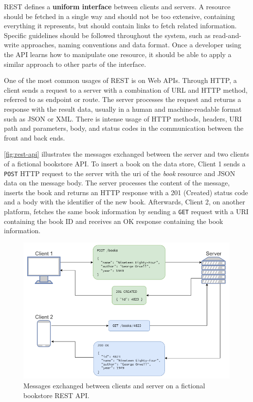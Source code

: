 REST defines a \textbf{uniform interface} between clients and servers. A resource should be fetched in a single way and should not be too extensive, containing everything it represents, but should contain links to fetch related information. Specific guidelines should be followed throughout the system, such as read-and-write approaches, naming conventions and data format. Once a developer using the API learns how to manipulate one resource, it should be able to apply a similar approach to other parts of the interface.

One of the most common usages of REST is on Web APIs. Through HTTP, a client sends a request to a server with a combination of URL and HTTP method, referred to as endpoint or route. The server processes the request and returns a response with the result data, usually in a human and machine-readable format such as JSON or XML. There is intense usage of HTTP methods, headers, URI path and parameters, body, and status codes in the communication between the front and back ends.

\autoref{fig:rest-api} illustrates the messages exchanged between the server and two clients of a fictional bookstore API. To insert a book on the data store, Client 1 sends a \texttt{POST} HTTP request to the server with the \acrshort{uri} of the \textit{book} resource and JSON data on the message body. The server processes the content of the message, inserts the book and returns an HTTP response with a 201 (Created) status code and a body with the identifier of the new book. Afterwards, Client 2, on another platform, fetches the same book information by sending a \texttt{GET} request with a URI containing the book ID and receives an OK response containing the book information.

\begin{figure}[htbp]
  \centering
  \includegraphics[scale=0.565]{Imagens/chap02/rest-api.png}
  \caption{Messages exchanged between clients and server on a fictional bookstore REST API.}
  \label{fig:rest-api}
\end{figure}

